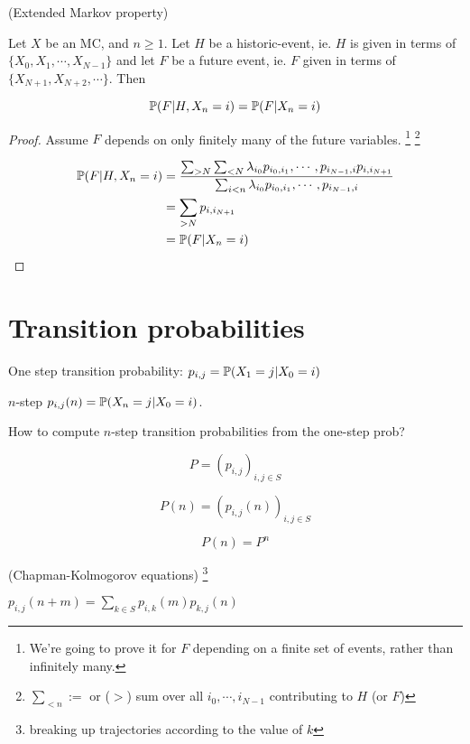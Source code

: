 \documentclass[a4paper]{article}
\begin{document}
\begin{thm} (Extended Markov property)
	
	Let $ X $ be an MC, and $ n \geq 1 $. Let $ H $ be a historic-event, ie. $ H $ is given in terms of $ \{  X_{0},X_{1},\cdots,X_{N-1}\} $ and let $ F $ be a future event, ie. $ F $ given in terms of $ \{ X_{N+1},X_{N+2},\cdots \} $. Then
	
	\[ \P(F | H, X_{n} = i) = \P(F | X_{n} = i) \]
\end{thm}

\begin{proof}
	Assume $ F $ depends on only finitely many of the future variables.  \footnote{We're going to prove it for $ F $ depending on a finite set of events, rather than infinitely many.} \footnote{ $ \sum_{<n} := $ or ($>$) sum over all $ i_{0},\cdots,i_{N-1} $ contributing to $ H $ (or $ F $)}
	
	\begin{align*}
	\P(F | H,X_{n}= i) & = \frac{ \sum_{>N}  \sum_{< N} \lambda_{i_{0}}p_{i_{0},i_{1}},\cdots,p_{i_{N-1},i} p_{i,i_{N+1}} }{ \sum_{i < n} \lambda_{i_{0}}p_{i_{0},i_{1}},\cdots,p_{i_{N-1},i}}  \\
	& = \sum_{>N} p_{i,i_{N+1}} \\
	& = \P(F | X_{n} = i)
	\end{align*}
	
\end{proof}

\section{Transition probabilities}

One step transition probability: $ p_{i,j} = \P (X_{1} = j | X_{0} = i) $


$ n $-step $ p_{i,j} (n) = \P(X_{n} = j | X_{0} = i) $.

\begin{eg}
	How to compute $ n $-step transition probabilities from the one-step prob?
\end{eg}

\[ P = (p_{i,j})_{i,j \in S} \]

\[ P(n) = (p_{i,j}(n))_{i,j \in S} \]

\begin{thm} 
	\[ P(n) = P^{n} \]
\end{thm}

\begin{prop} (Chapman-Kolmogorov equations) \footnote{breaking up trajectories according to the value of $ k $}
	
	
	
	$ p_{i,j}(n+m) = \sum_{k \in S} p_{i,k} (m) p_{k,j} (n) $
\end{prop}
\end{document}

